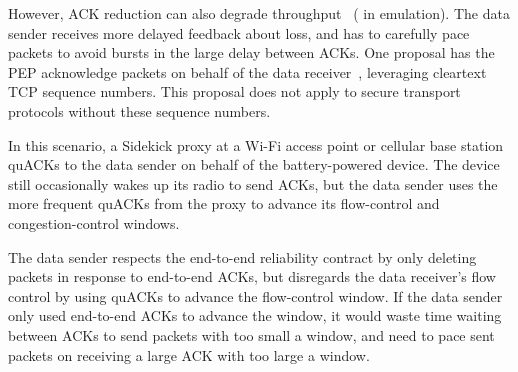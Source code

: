 However, ACK reduction can also degrade
throughput~\cite{custura2023reducing,custura2020impact}
( in emulation).
The data sender receives more delayed feedback about loss, and has to carefully
pace packets to avoid bursts in the large delay between ACKs.
One proposal has the PEP acknowledge packets on behalf of the data
receiver~\cite{kliazovich2012arqproxy}, leveraging cleartext TCP sequence
numbers. This proposal does not apply to secure transport protocols without
these sequence numbers.

In this scenario, a Sidekick proxy at a Wi-Fi access point or cellular base station
quACKs to the data sender on behalf of the battery-powered device. The device still occasionally
wakes up its radio to send ACKs, but the data sender uses the more frequent quACKs
from the proxy to advance its flow-control and congestion-control windows.

The data sender respects the end-to-end reliability contract by only deleting packets
in response to end-to-end ACKs, but disregards the data receiver's flow control by using quACKs
to advance the flow-control window. If the data sender only used end-to-end ACKs to advance the
window, it would waste time waiting between ACKs to send packets with too small
a window, and need to pace sent packets on receiving a large ACK with too large
a window.
